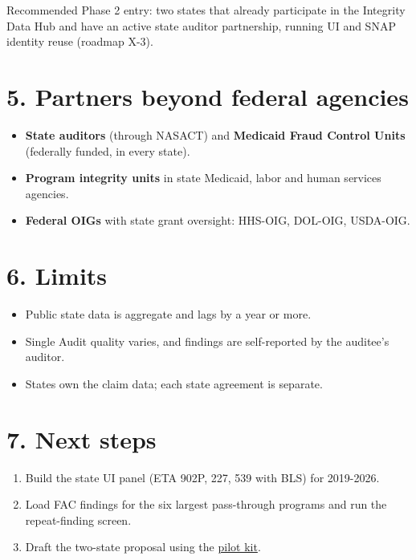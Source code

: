 \documentclass[letterpaper,11pt]{article}
\providecommand{\tightlist}{\setlength{\itemsep}{0pt}\setlength{\parskip}{0pt}}
\begin{document}
Recommended Phase 2 entry: two states that already participate in the
Integrity Data Hub and have an active state auditor partnership, running
UI and SNAP identity reuse (roadmap X-3).

\hypertarget{partners-beyond-federal-agencies}{%
\section*{5. Partners beyond federal
agencies}\label{partners-beyond-federal-agencies}}

\begin{itemize}
\tightlist
\item
  \textbf{State auditors} (through NASACT) and \textbf{Medicaid Fraud
  Control Units} (federally funded, in every state).
\item
  \textbf{Program integrity units} in state Medicaid, labor and human
  services agencies.
\item
  \textbf{Federal OIGs} with state grant oversight: HHS-OIG, DOL-OIG,
  USDA-OIG.
\end{itemize}

\hypertarget{limits}{%
\section*{6. Limits}\label{limits}}

\begin{itemize}
\tightlist
\item
  Public state data is aggregate and lags by a year or more.
\item
  Single Audit quality varies, and findings are self-reported by the
  auditee's auditor.
\item
  States own the claim data; each state agreement is separate.
\end{itemize}

\hypertarget{next-steps}{%
\section*{7. Next steps}\label{next-steps}}

\begin{enumerate}
\def\labelenumi{\arabic{enumi}.}
\tightlist
\item
  Build the state UI panel (ETA 902P, 227, 539 with BLS) for 2019-2026.
\item
  Load FAC findings for the six largest pass-through programs and run
  the repeat-finding screen.
\item
  Draft the two-state proposal using the
  \href{../proposals/pilot_kit.pdf}{pilot kit}.
\end{enumerate}
\end{document}
